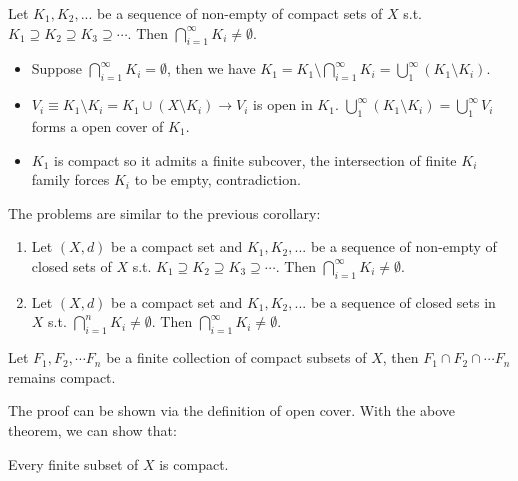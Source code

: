 \documentclass[12pt]{article}
\begin{document}
\begin{corollary}
    Let $K_1, K_2,...$ be a sequence of non-empty of compact sets of $X$ s.t.
    \(K_1\supseteq K_2\supseteq K_3\supseteq\cdots\). Then $\bigcap^{\infty}_{i=1} K_i\neq\emptyset.$
\end{corollary}

\begin{pfbox}
    \begin{itemize}
        \item Suppose $\bigcap^{\infty}_{i=1} K_i=\emptyset$, then we have $K_1=K_1\setminus\bigcap^{\infty}_{i=1} K_i=\bigcup^{\infty}_1 (K_1\setminus K_i).$
        \item $V_i \equiv K_1\setminus K_i = K_1\cup(X\setminus K_i)\rightarrow V_i$ is open in $K_1$. $\bigcup^{\infty}_1 (K_1\setminus K_i) =\bigcup^{\infty}_1 V_i$ forms a open cover of $K_1$.
        \item $K_1$ is compact so it admits a finite subcover, the intersection of finite $K_i$ family forces $K_i$ to be empty, contradiction.
    \end{itemize}
\end{pfbox}


\begin{exercise}
    The problems are similar to the previous corollary:
    \begin{enumerate}
    \item Let $(X,d)$ be a compact set and $K_1, K_2,...$ be a sequence of non-empty of closed sets of $X$ s.t.
    \(K_1\supseteq K_2\supseteq K_3\supseteq\cdots\). Then $\bigcap^{\infty}_{i=1} K_i\neq\emptyset.$
    \item  Let $(X,d)$ be a compact set and $K_1, K_2,...$ be a sequence of closed sets in $X$ s.t.
    \(\bigcap^{n}_{i=1} K_i\neq\emptyset\). Then $\bigcap^{\infty}_{i=1} K_i\neq\emptyset.$
    \end{enumerate}
\end{exercise}

\begin{theorem}
    Let $F_1,F_2,\cdots F_n$ be a finite collection of compact subsets of $X$, then $F_1\cap F_2\cap\cdots F_n$ remains compact.
\end{theorem}

The proof can be shown via the definition of open cover. With the above theorem, we can show that:

\begin{theorem}
    Every finite subset of $X$ is compact.
\end{theorem}
\end{document}
